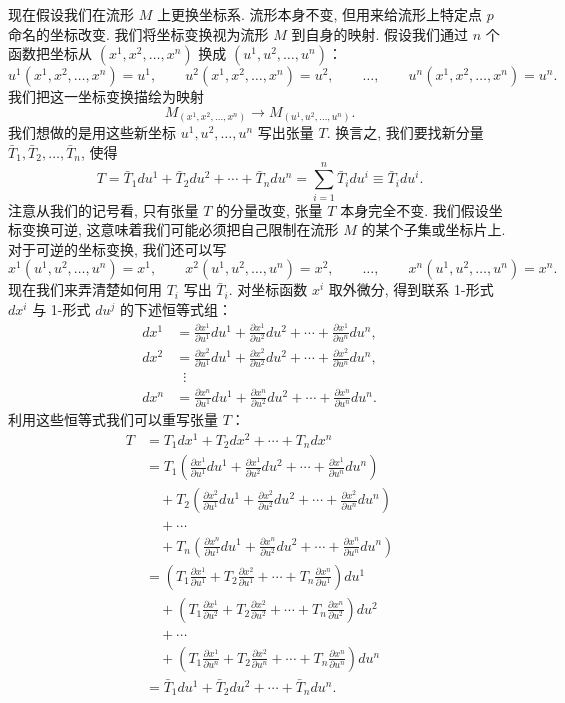 现在假设我们在流形 $M$ 上更换坐标系. 流形本身不变, 但用来给流形上特定点 $p$ 命名的坐标改变. 我们将坐标变换视为流形 $M$ 到自身的映射. 假设我们通过 $n$ 个函数把坐标从 $(x^1,x^2,\ldots,x^n)$ 换成 $(u^1,u^2,\ldots,u^n)$：
\[
u^1(x^1,x^2,\ldots,x^n)=u^1,\qquad
u^2(x^1,x^2,\ldots,x^n)=u^2,\qquad\ldots,\qquad
u^n(x^1,x^2,\ldots,x^n)=u^n.
\]
我们把这一坐标变换描绘为映射
\[
M_{(x^1,x^2,\ldots,x^n)}\longrightarrow M_{(u^1,u^2,\ldots,u^n)}.
\]
我们想做的是用这些新坐标 $u^1,u^2,\ldots,u^n$ 写出张量 $T$. 换言之, 我们要找新分量 $\bar{T}_1,\bar{T}_2,\ldots,\bar{T}_n$, 使得
\[
T=\bar{T}_1du^1+\bar{T}_2du^2+\cdots+\bar{T}_ndu^n=\sum_{i=1}^{n}\bar{T}_idu^i\equiv\bar{T}_idu^i.
\]
注意从我们的记号看, 只有张量 $T$ 的分量改变, 张量 $T$ 本身完全不变. 我们假设坐标变换可逆, 这意味着我们可能必须把自己限制在流形 $M$ 的某个子集或坐标片上. 对于可逆的坐标变换, 我们还可以写
\[
x^1(u^1,u^2,\ldots,u^n)=x^1,\qquad
x^2(u^1,u^2,\ldots,u^n)=x^2,\qquad\ldots,\qquad
x^n(u^1,u^2,\ldots,u^n)=x^n.
\]
现在我们来弄清楚如何用 $T_i$ 写出 $\bar{T}_i$. 对坐标函数 $x^i$ 取外微分, 得到联系 1-形式 $dx^i$ 与 1-形式 $du^j$ 的下述恒等式组：
\begin{align*}
dx^1&=\frac{\partial x^1}{\partial u^1}du^1+\frac{\partial x^1}{\partial u^2}du^2+\cdots+\frac{\partial x^1}{\partial u^n}du^n,\\
dx^2&=\frac{\partial x^2}{\partial u^1}du^1+\frac{\partial x^2}{\partial u^2}du^2+\cdots+\frac{\partial x^2}{\partial u^n}du^n,\\
&\;\;\vdots\\
dx^n&=\frac{\partial x^n}{\partial u^1}du^1+\frac{\partial x^n}{\partial u^2}du^2+\cdots+\frac{\partial x^n}{\partial u^n}du^n.
\end{align*}
利用这些恒等式我们可以重写张量 $T$：
\begin{align*}
T&=T_1dx^1+T_2dx^2+\cdots+T_ndx^n\\
&=T_1\left(\frac{\partial x^1}{\partial u^1}du^1+\frac{\partial x^1}{\partial u^2}du^2+\cdots+\frac{\partial x^1}{\partial u^n}du^n\right)\\
&\quad+T_2\left(\frac{\partial x^2}{\partial u^1}du^1+\frac{\partial x^2}{\partial u^2}du^2+\cdots+\frac{\partial x^2}{\partial u^n}du^n\right)\\
&\quad+\cdots\\
&\quad+T_n\left(\frac{\partial x^n}{\partial u^1}du^1+\frac{\partial x^n}{\partial u^2}du^2+\cdots+\frac{\partial x^n}{\partial u^n}du^n\right)\\
&=\left(T_1\frac{\partial x^1}{\partial u^1}+T_2\frac{\partial x^2}{\partial u^1}+\cdots+T_n\frac{\partial x^n}{\partial u^1}\right)du^1\\
&\quad+\left(T_1\frac{\partial x^1}{\partial u^2}+T_2\frac{\partial x^2}{\partial u^2}+\cdots+T_n\frac{\partial x^n}{\partial u^2}\right)du^2\\
&\quad+\cdots\\
&\quad+\left(T_1\frac{\partial x^1}{\partial u^n}+T_2\frac{\partial x^2}{\partial u^n}+\cdots+T_n\frac{\partial x^n}{\partial u^n}\right)du^n\\
&=\bar{T}_1du^1+\bar{T}_2du^2+\cdots+\bar{T}_ndu^n.
\end{align*}

